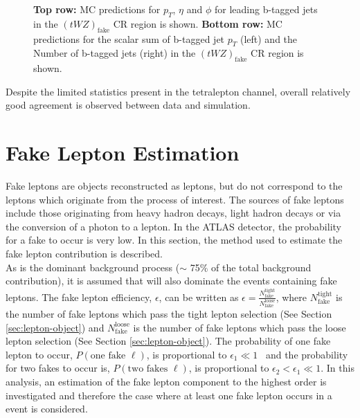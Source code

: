 \begin{figure}[htbp]
    \caption{\textbf{Top row:} MC predictions for $p_{T}$, $\eta$ and $\phi$ for leading b-tagged jets in the $(tWZ)_{\text{fake}}$ CR region  is shown. \textbf{Bottom row:} MC predictions for the scalar sum of b-tagged jet $p_{T}$ (left) and the Number of b-tagged jets (right) in the $(tWZ)_{\text{fake}}$ CR region  is shown.}
  \label{fig:4lep-tWZ-fake-CR-bjetPlots}
\end{figure}


Despite the limited statistics present in the tetralepton channel, overall relatively good agreement is observed between data and simulation.

\section{Fake Lepton Estimation}
\label{sec:fakelepest}
Fake leptons are objects reconstructed as leptons, but do not correspond to the leptons which originate from the process of interest. The sources of fake leptons include those originating from heavy hadron decays, light hadron decays or via the conversion of a photon to a lepton. In the ATLAS detector, the probability for a fake to occur is very low. In this section, the method used to estimate the fake lepton contribution is described.\\

As \ttZ is the dominant background process ($\sim$ 75$\%$ of the total background contribution), it is assumed that \ttZ will also dominate the events containing fake leptons. The fake lepton efficiency, $\epsilon$, can be written as $\epsilon = \frac{N_{\text{fake}}^{\text{tight}}}{N_{\text{fake}}^{\text{loose}}}$, where $N_{\text{fake}}^{\text{tight}}$ is the number of fake leptons which pass the tight lepton selection (See Section \ref{sec:lepton-object}) and $N_{\text{fake}}^{\text{loose}}$ is the number of fake leptons which pass the loose lepton selection (See Section \ref{sec:lepton-object}). The probability of one fake lepton to occur, $P(\text{one fake }\ell)$, is proportional to $\epsilon_{1} \ll 1$~\cite{lesage2017lepton, ATLAS-CONF-2012-048} and the probability for two fakes to occur is, $P(\text{two fakes }\ell)$, is proportional to $\epsilon_{2} < \epsilon_{1} \ll 1$. In this analysis, an estimation of the fake lepton component to the highest order is investigated and therefore the case where at least one fake lepton occurs in a \ttZ event is considered.\\

